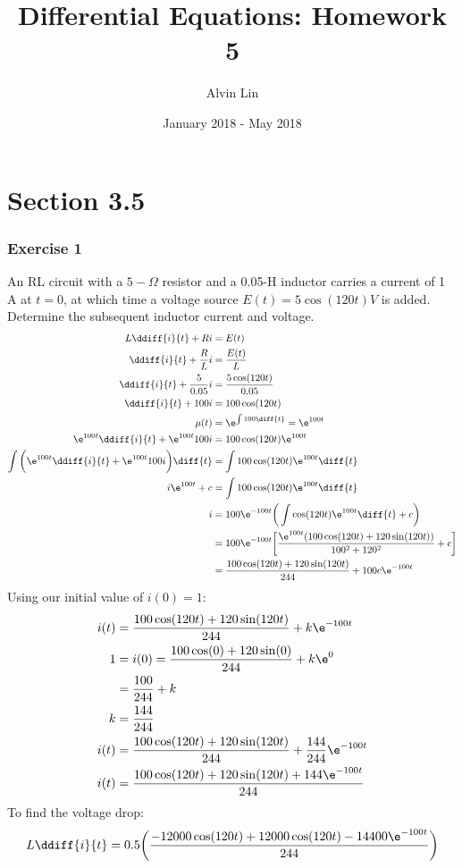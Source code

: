 \documentclass{math}
\title{Differential Equations: Homework 5}
\author{Alvin Lin}
\date{January 2018 - May 2018}
\begin{document}
\maketitle
\clearpage

\section*{Section 3.5}

\subsubsection*{Exercise 1}
An RL circuit with a \( 5-\Omega \) resistor and a 0.05-H inductor carries a
current of 1 A at \( t = 0 \), at which time a voltage source
\( E(t) = 5\cos(120t)V \) is added. Determine the subsequent inductor current
and voltage.
\begin{align*}
  L\ddiff{i}{t}+Ri &= E(t) \\
  \ddiff{i}{t}+\frac{R}{L}i &= \frac{E(t)}{L} \\
  \ddiff{i}{t}+\frac{5}{0.05}i &= \frac{5\cos(120t)}{0.05} \\
  \ddiff{i}{t}+100i &= 100\cos(120t) \\
  \mu(t) &= \e^{\int100\diff{t}} = \e^{100t} \\
  \e^{100t}\ddiff{i}{t}+\e^{100t}100i &= 100\cos(120t)\e^{100t} \\
  \int\bigg(\e^{100t}\ddiff{i}{t}+\e^{100t}100i\bigg)\diff{t} &=
    \int100\cos(120t)\e^{100t}\diff{t} \\
  i\e^{100t}+c &= \int100\cos(120t)\e^{100t}\diff{t} \\
  i &= 100\e^{-100t}\bigg(\int\cos(120t)\e^{100t}\diff{t}+c\bigg) \\
  &= 100\e^{-100t}\bigg[
    \frac{\e^{100t}(100\cos(120t)+120\sin(120t))}{100^2+120^2}+c\bigg] \\
  &= \frac{100\cos(120t)+120\sin(120t)}{244}+100c\e^{-100t}
\end{align*}
Using our initial value of \( i(0) = 1 \):
\begin{align*}
  i(t) &= \frac{100\cos(120t)+120\sin(120t)}{244}+k\e^{-100t} \\
  1 &= i(0) = \frac{100\cos(0)+120\sin(0)}{244}+k\e^{0} \\
  &= \frac{100}{244}+k \\
  k &= \frac{144}{244} \\
  i(t) &= \frac{100\cos(120t)+120\sin(120t)}{244}+\frac{144}{244}\e^{-100t} \\
  i(t) &= \frac{100\cos(120t)+120\sin(120t)+144\e^{-100t}}{244} \\
\end{align*}
To find the voltage drop:
\begin{align*}
  L\ddiff{i}{t} &= 0.5\bigg(
    \frac{-12000\cos(120t)+12000\cos(120t)-14400\e^{-100t}}{244}\bigg) \\
\end{align*}
\end{document}
